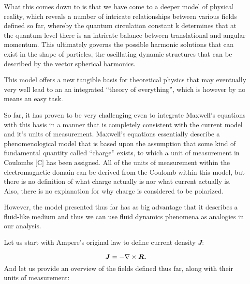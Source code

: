 \documentclass[a4paper]{article}
\newcommand\textstyleNone[1]{#1}
\newcounter{Text}
\newcommand\boldsubformula[1]{\text{\mathversion{bold}$#1$}}
\begin{document}
{\color[rgb]{0.101960786,0.101960786,0.101960786}
\textstyleNone{What this comes down to is that we have come to a deeper model of physical reality, which reveals a
number of intricate relationships between various fields defined so far, whereby the quantum circulation constant
}\textstyleNone{k}\textstyleNone{ determines that at the quantum level there is an intricate balance between
translational and angular momentum. This ultimately governs the possible har}\textstyleNone{monic solutions that can
exist in the shape of particles, the oscillating dynamic structures that can be described by the vector spherical
harmonics.  }}

{\color[rgb]{0.101960786,0.101960786,0.101960786}
\textstyleNone{This model offers a new tangible basis for theoretical physics that may eventually very well lead to an
an integrated ``theory of everything'', which is however by no means an easy task. }}

{\color[rgb]{0.101960786,0.101960786,0.101960786}
\textstyleNone{So far, it has proven to be very challenging even to integrate Maxwell's equations with this basis in a
manner that is completely consistent with the current model and it's units of measurement. Maxwell's equations
essentially describe a phenomenological model that is based upon the assumption that some kind of fundamental quantity
called ``charge'' exists, to which a unit of measurement in Coulombs [C] has been assigned. All of the units of
measurement within the electromagnetic domain can be derived from the Coulomb within this model, but there is no
definition of what charge actually is nor what current actually is. Also, there is no explanation for why charge is
considered to be polarized. }}

{\color[rgb]{0.101960786,0.101960786,0.101960786}
\textstyleNone{However, the model presented thus far has as big advantage that it describes a fluid-like medium and thus
we can use fluid dynamics phenomena as analogies in our analysis. }}

{\color[rgb]{0.101960786,0.101960786,0.101960786}
\textstyleNone{Let us start with Ampere's original law to define current density \textbf{\textit{J}}:}}

\begin{equation}\label{seq:refText37}
\boldsubformula J=-\nabla \times \boldsubformula{\mathit{R.}}
\end{equation}
And let us provide an overview of the fields defined thus far, along with their units of measurement:
\end{document}
